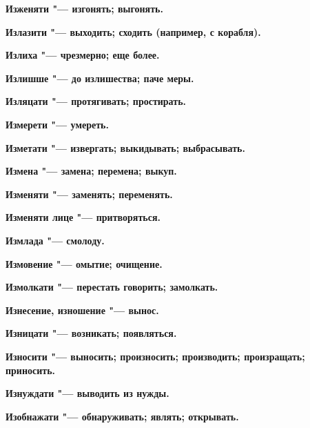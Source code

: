 \bfseries Изженяти \normalfont{} "--- изгонять; выгонять. 




\bfseries Излазити \normalfont{} "--- выходить; сходить (например, с корабля). 




\bfseries Излиха \normalfont{} "--- чрезмерно; еще более. 




\bfseries Излишше \normalfont{} "--- до излишества; паче меры. 




\bfseries Изляцати \normalfont{} "--- протягивать; простирать. 




\bfseries Измерети \normalfont{} "--- умереть. 




\bfseries Изметати \normalfont{} "--- извергать; выкидывать; выбрасывать. 




\bfseries Измена \normalfont{} "--- замена; перемена; выкуп. 




\bfseries Изменяти \normalfont{} "--- заменять; переменять. 




\bfseries Изменяти лице \normalfont{} "--- притворяться. 




\bfseries Измлада \normalfont{} "--- смолоду. 




\bfseries Измовение \normalfont{} "--- омытие; очищение. 




\bfseries Измолкати \normalfont{} "--- перестать говорить; замолкать. 




\bfseries Изнесение, изношение \normalfont{} "--- вынос. 




\bfseries Изницати \normalfont{} "--- возникать; появляться. 




\bfseries Износити \normalfont{} "--- выносить; произносить; производить; произращать; приносить. 




\bfseries Изнуждати \normalfont{} "--- выводить из нужды. 




\bfseries Изобнажати \normalfont{} "--- обнаруживать; являть; открывать. 




